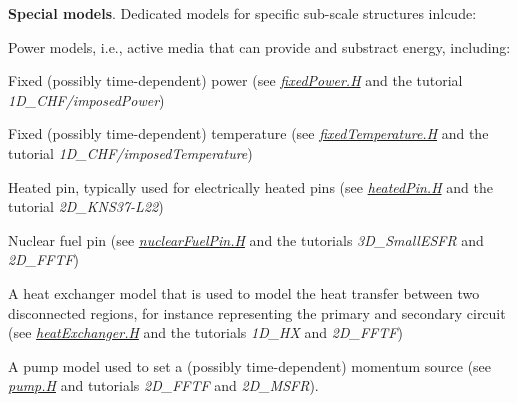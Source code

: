  {\bfseries Special models}. Dedicated models for specific sub-\/scale structures inlcude\+: 
\begin{DoxyItemize}
\item Power models, i.\+e., active media that can provide and substract energy, including\+: 
\begin{DoxyItemize}
\item Fixed (possibly time-\/dependent) power (see {\itshape \hyperlink{fixedPower_8H}{fixed\+Power.\+H}} and the tutorial {\itshape 1\+D\+\_\+\+C\+H\+F/imposed\+Power}) 
\item Fixed (possibly time-\/dependent) temperature (see {\itshape \hyperlink{fixedTemperature_8H}{fixed\+Temperature.\+H}} and the tutorial {\itshape 1\+D\+\_\+\+C\+H\+F/imposed\+Temperature}) 
\item Heated pin, typically used for electrically heated pins (see {\itshape \hyperlink{heatedPin_8H}{heated\+Pin.\+H}} and the tutorial {\itshape 2\+D\+\_\+\+K\+N\+S37-\/\+L22}) 
\item Nuclear fuel pin (see {\itshape \hyperlink{nuclearFuelPin_8H}{nuclear\+Fuel\+Pin.\+H}} and the tutorials {\itshape 3\+D\+\_\+\+Small\+E\+S\+FR} and {\itshape 2\+D\+\_\+\+F\+F\+TF}) 
\end{DoxyItemize}
\item A heat exchanger model that is used to model the heat transfer between two disconnected regions, for instance representing the primary and secondary circuit (see {\itshape \hyperlink{heatExchanger_8H}{heat\+Exchanger.\+H}} and the tutorials {\itshape 1\+D\+\_\+\+HX} and {\itshape 2\+D\+\_\+\+F\+F\+TF}) 
\item A pump model used to set a (possibly time-\/dependent) momentum source (see {\itshape \hyperlink{pump_8H}{pump.\+H}} and tutorials {\itshape 2\+D\+\_\+\+F\+F\+TF} and {\itshape 2\+D\+\_\+\+M\+S\+FR}). 
\end{DoxyItemize}~\newline
 

